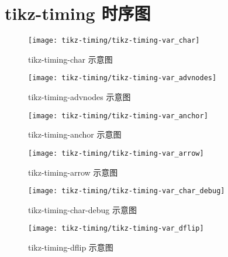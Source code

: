 \section{tikz-timing 时序图}


\begin{figure}[H]
  \centering
  \texttt{[image: tikz-timing/tikz-timing-var\_char]}\\
  \caption{tikz-timing-char 示意图}\label{tikz-timing-var_char}
\end{figure}

\begin{figure}[H]
  \centering
  \texttt{[image: tikz-timing/tikz-timing-var\_advnodes]}\\
  \caption{tikz-timing-advnodes 示意图}\label{tikz-timing-var_advnodes}
\end{figure}

\begin{figure}[H]
  \centering
  \texttt{[image: tikz-timing/tikz-timing-var\_anchor]}\\
  \caption{tikz-timing-anchor 示意图}\label{tikz-timing-var_anchor}
\end{figure}


\begin{figure}[H]
  \centering
  \texttt{[image: tikz-timing/tikz-timing-var\_arrow]}\\
  \caption{tikz-timing-arrow 示意图}\label{tikz-timing-var_arrow}
\end{figure}


\begin{figure}[H]
  \centering
  \texttt{[image: tikz-timing/tikz-timing-var\_char\_debug]}\\
  \caption{tikz-timing-char-debug 示意图}\label{tikz-timing-var_char_debug}
\end{figure}


\begin{figure}[H]
  \centering
  \texttt{[image: tikz-timing/tikz-timing-var\_dflip]}\\
  \caption{tikz-timing-dflip 示意图}\label{tikz-timing-var_dflip}
\end{figure}



